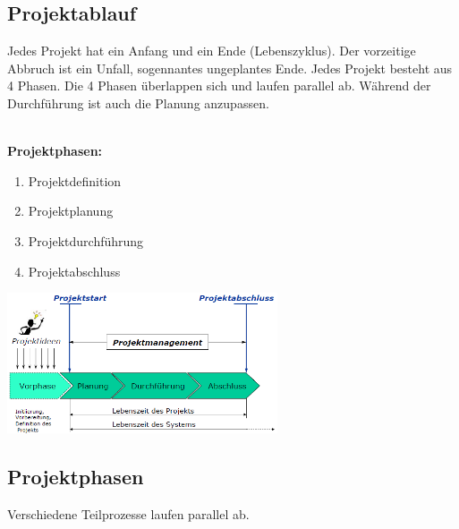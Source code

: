 \subsection{Projektablauf}
Jedes Projekt hat ein Anfang und ein Ende (Lebenszyklus). Der vorzeitige Abbruch ist ein Unfall, sogennantes ungeplantes Ende. Jedes Projekt besteht aus 4 Phasen. Die 4 Phasen überlappen sich und laufen parallel ab. Während der Durchführung ist auch die Planung anzupassen. \\
\\
\begin{minipage}{6cm}
	\textbf{Projektphasen:}
	\begin{enumerate}
		\item Projektdefinition
		\item Projektplanung
		\item Projektdurchführung
		\item Projektabschluss
	\end{enumerate}
\end{minipage}
\begin{minipage}{7cm}
	\includegraphics[width=8cm]{images/projektablauf.png}
\end{minipage}

\subsection{Projektphasen}
Verschiedene Teilprozesse laufen parallel ab. 
